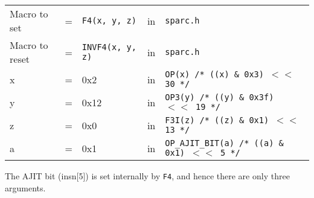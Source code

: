 \begin{enumerate}
  \begin{tabular}[h]{lclcl}
    Macro to set  &=& \texttt{F4(x, y, z)} &in& \texttt{sparc.h}     \\
    Macro to reset  &=& \texttt{INVF4(x, y, z)} &in& \texttt{sparc.h}     \\
    x &=& 0x2      &in& \texttt{OP(x)  /* ((x) \& 0x3)  $<<$ 30 */} \\
    y &=& 0x12     &in& \texttt{OP3(y) /* ((y) \& 0x3f) $<<$ 19 */} \\
    z &=& 0x0      &in& \texttt{F3I(z) /* ((z) \& 0x1)  $<<$ 13 */} \\
    a &=& 0x1      &in& \texttt{OP\_AJIT\_BIT(a) /* ((a) \& 0x1)  $<<$ 5 */}
  \end{tabular}

  The AJIT bit  (insn[5]) is set internally by  \texttt{F4}, and hence
  there are only three arguments.


\end{enumerate}
